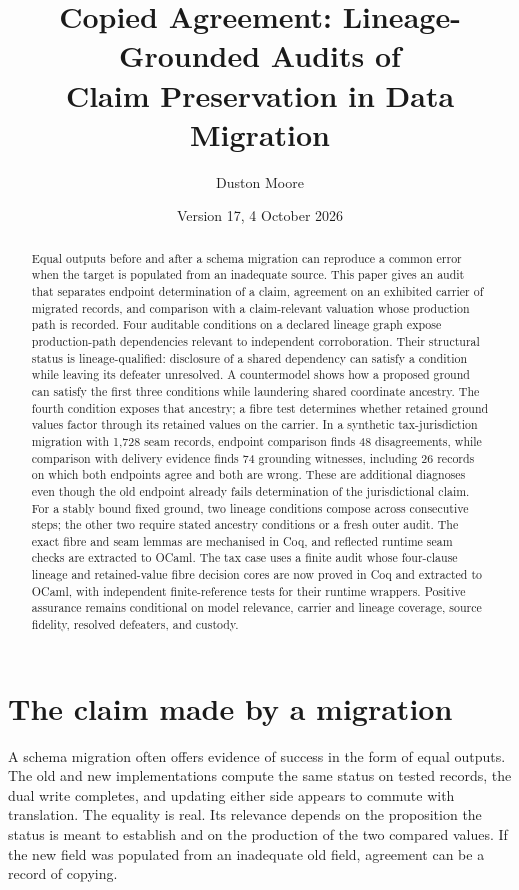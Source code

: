 \documentclass[11pt]{article}
\title{Copied Agreement: Lineage-Grounded Audits of\\ Claim Preservation in Data Migration}
\author{Duston Moore}
\date{Version 17, 4 October 2026}
\theoremstyle{definition}
\begin{document}
\maketitle
\begin{abstract}
Equal outputs before and after a schema migration can reproduce a common error when the target is populated from an inadequate source. This paper gives an audit that separates endpoint determination of a claim, agreement on an exhibited carrier of migrated records, and comparison with a claim-relevant valuation whose production path is recorded. Four auditable conditions on a declared lineage graph expose production-path dependencies relevant to independent corroboration. Their structural status is lineage-qualified: disclosure of a shared dependency can satisfy a condition while leaving its defeater unresolved. A countermodel shows how a proposed ground can satisfy the first three conditions while laundering shared coordinate ancestry. The fourth condition exposes that ancestry; a fibre test determines whether retained ground values factor through its retained values on the carrier. In a synthetic tax-jurisdiction migration with 1,728 seam records, endpoint comparison finds 48 disagreements, while comparison with delivery evidence finds 74 grounding witnesses, including 26 records on which both endpoints agree and both are wrong. These are additional diagnoses even though the old endpoint already fails determination of the jurisdictional claim. For a stably bound fixed ground, two lineage conditions compose across consecutive steps; the other two require stated ancestry conditions or a fresh outer audit. The exact fibre and seam lemmas are mechanised in Coq, and reflected runtime seam checks are extracted to OCaml. The tax case uses a finite audit whose four-clause lineage and retained-value fibre decision cores are now proved in Coq and extracted to OCaml, with independent finite-reference tests for their runtime wrappers. Positive assurance remains conditional on model relevance, carrier and lineage coverage, source fidelity, resolved defeaters, and custody.
\end{abstract}

\section{The claim made by a migration}\label{ex:sec:intro}
A schema migration often offers evidence of success in the form of equal outputs. The old and new implementations compute the same status on tested records, the dual write completes, and updating either side appears to commute with translation. The equality is real. Its relevance depends on the proposition the status is meant to establish and on the production of the two compared values. If the new field was populated from an inadequate old field, agreement can be a record of copying.
\end{document}
